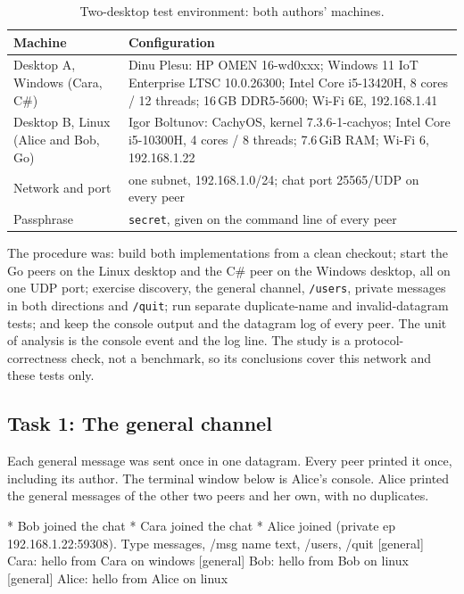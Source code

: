 \documentclass[12pt,a4paper]{article}
\begin{document}
\begin{table}[H]
\centering
\small
\begin{tabularx}{\textwidth}{@{}l X@{}}
\toprule
\textbf{Machine} & \textbf{Configuration} \\
\midrule
Desktop A, Windows (Cara, C\#) & Dinu Plesu: HP OMEN 16-wd0xxx; Windows 11 IoT Enterprise LTSC 10.0.26300; Intel Core i5-13420H, 8 cores / 12 threads; 16\,GB DDR5-5600; Wi-Fi 6E, 192.168.1.41 \\
Desktop B, Linux (Alice and Bob, Go) & Igor Boltunov: CachyOS, kernel 7.3.6-1-cachyos; Intel Core i5-10300H, 4 cores / 8 threads; 7.6\,GiB RAM; Wi-Fi 6, 192.168.1.22 \\
Network and port & one subnet, 192.168.1.0/24; chat port 25565/UDP on every peer \\
Passphrase & \texttt{secret}, given on the command line of every peer \\
\bottomrule
\end{tabularx}
\caption{Two-desktop test environment: both authors' machines.}
\label{tab:env}
\end{table}

The procedure was: build both implementations from a clean checkout; start the Go
peers on the Linux desktop and the C\# peer on the Windows desktop, all on one UDP
port; exercise discovery, the general channel, \texttt{/users}, private messages in
both directions and \texttt{/quit}; run separate duplicate-name and invalid-datagram
tests; and keep the console output and the datagram log of every peer. The unit of
analysis is the console event and the log line. The study is a protocol-correctness
check, not a benchmark, so its conclusions cover this network and these tests only.

\subsection{Task 1: The general channel}
\label{sec:task1}
Each general message was sent once in one datagram. Every peer printed it once,
including its author. The terminal window below is Alice's console. Alice printed
the general messages of the other two peers and her own, with no duplicates.

\begin{terminalwindow}[]
* Bob joined the chat
* Cara joined the chat
* Alice joined (private ep 192.168.1.22:59308). Type messages, /msg name text, /users, /quit
[general] Cara: hello from Cara on windows
[general] Bob: hello from Bob on linux
[general] Alice: hello from Alice on linux
\end{terminalwindow}
\end{document}
